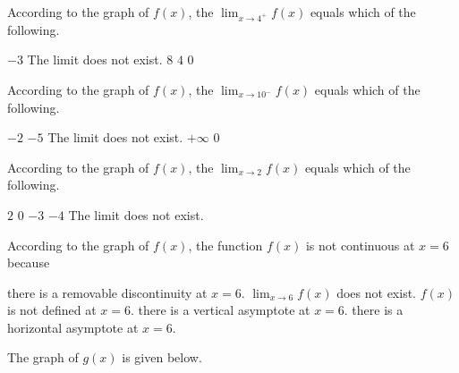 \documentclass[11pt]{article}
\begin{document}
\begin{questions}
\begin{multiplechoice}{5}

\question According to the graph of $f(x)$, the $\lim_{x\to 4^+}f(x) $ equals which of the following.
\begin{answers}{3}
\ans $-3$
\ans The limit does not exist.
\ans $8$
\ans $4$
\ans $0$
\end{answers}



\question According to the graph of $f(x)$, the $\lim_{x\to 10^-}f(x) $ equals which of the following.
\begin{answers}{3}
\ans $-2$
\ans $-5$
\ans The limit does not exist.
\ans $+\infty$
\ans $0$
\end{answers}


\question According to the graph of $f(x)$, the $\lim_{x\to 2}f(x) $ equals which of the following.
\begin{answers}{3}
\ans $2$
\ans $0$
\ans $-3$
\ans $-4$
\ans The limit does not exist.
\end{answers}





\question According to the graph of $f(x)$, the function $f(x)$ is not continuous at $x=6$ because
\begin{answers}{3}
\ans there is a removable discontinuity at $x=6$.
\ans $\lim_{x\to 6}f(x)$ does not exist.
\ans $f(x)$ is not defined at $x=6$.
\ans there is a vertical asymptote at $x=6$.
\ans there is a horizontal asymptote at $x=6$. 
\end{answers}



\nextpage

\question The graph of $g(x)$ is given below.\\


\end{multiplechoice}
\end{questions}
\end{document}
